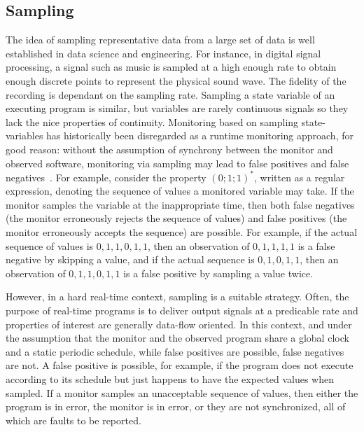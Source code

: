 \subsection{Sampling} \label{sampling}
The idea of sampling representative data from a large set of data  is well
established in data science and engineering. For instance, in digital
signal processing, a signal such as music is sampled at a high enough
rate to obtain enough discrete points to represent the physical sound
wave. The fidelity of the recording is dependant on the sampling
rate. Sampling a state variable of an executing program is similar,
but variables are rarely continuous signals so they lack the nice
properties of continuity.
Monitoring based on sampling state-variables has historically been disregarded
as a runtime monitoring approach, for good reason: without the assumption of
synchrony between the monitor and observed software, monitoring via sampling may
lead to false positives and false negatives~\cite{DwyerDE08}.  For example,
consider the property $(0;1;1)^*$, written as a regular expression, denoting the
sequence of values a monitored variable may take.  If the monitor samples the
variable at the inappropriate time, then both false negatives (the monitor
erroneously rejects the sequence of values) and false positives (the monitor
erroneously accepts the sequence) are possible.  For example, if the actual
sequence of values is $0,1,1,0,1,1$, then an observation of $0,1,1,1,1$ is a
false negative by skipping a value, and if the actual sequence is $0,1,0,1,1$,
then an observation of $0,1,1,0,1,1$ is a false positive by sampling a value
twice.



However, in a hard real-time context, sampling is a suitable strategy.  Often,
the purpose of real-time programs is to deliver output signals at a predicable
rate and properties of interest are generally data-flow oriented.  In this
context, and under the assumption that the monitor and the observed program
share a global clock and a static periodic schedule, while false positives are
possible, false negatives are not.  A false positive is possible, for example,
if the program does not execute according to its schedule but just happens to
have the expected values when sampled.  If a monitor samples an unacceptable
sequence of values, then either the program is in error, the monitor is in
error, or they are not synchronized, all of which are faults to be reported.

